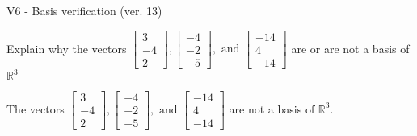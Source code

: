 \begin{exercise}
  \begin{exerciseTitle}V6 - Basis verification (ver. 13)\end{exerciseTitle}
  \begin{exerciseStatement}
    Explain why the vectors \(\left[\begin{array}{r}
3 \\
-4 \\
2
\end{array}\right] , \left[\begin{array}{r}
-4 \\
-2 \\
-5
\end{array}\right] , \text{ and } \left[\begin{array}{r}
-14 \\
4 \\
-14
\end{array}\right]\) are or are not a basis of \(\mathbb{R}^3\)	


  \end{exerciseStatement}
  \begin{exerciseAnswer}
   The vectors \(\left[\begin{array}{r}
3 \\
-4 \\
2
\end{array}\right] , \left[\begin{array}{r}
-4 \\
-2 \\
-5
\end{array}\right] , \text{ and } \left[\begin{array}{r}
-14 \\
4 \\
-14
\end{array}\right]\) 
  	 are not  a basis of \(\mathbb{R}^3\).
  


  \end{exerciseAnswer}
\end{exercise}